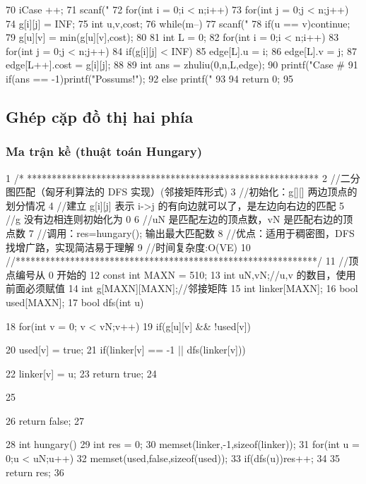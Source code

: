 \documentclass[11pt]{article}
\begin{document}
\begin{Code}
{{70              iCase ++;
71              scanf("%
72              for(int i = 0;i < n;i++)
73                  for(int j = 0;j < n;j++)
74                      g[i][j] = INF;
75              int u,v,cost;
76              while(m--){
77                  scanf("%
78                  if(u == v)continue;
79                  g[u][v] = min(g[u][v],cost);
80              }
81              int L = 0;
82              for(int i = 0;i < n;i++)
83                  for(int j = 0;j < n;j++)
84                      if(g[i][j] < INF){
85                          edge[L].u = i;
86                          edge[L].v = j;
87                          edge[L++].cost = g[i][j];
88                      }
89              int ans = zhuliu(0,n,L,edge);
90              printf("Case #%
91              if(ans == -1)printf("Possums!\n");
92              else printf("%
93       }
94       return 0;
95 }
\end{Code}

\subsection{Ghép cặp đồ thị hai phía}

\subsubsection{Ma trận kề (thuật toán Hungary)}

\begin{Code}
 1   /* ***********************************************************
 2   //二分图匹配（匈牙利算法的 DFS 实现）(邻接矩阵形式)
 3   //初始化：g[][] 两边顶点的划分情况
 4   //建立 g[i][j] 表示 i->j 的有向边就可以了，是左边向右边的匹配
 5   //g 没有边相连则初始化为 0
 6   //uN 是匹配左边的顶点数，vN 是匹配右边的顶点数
 7   //调用：res=hungary(); 输出最大匹配数
 8   //优点：适用于稠密图，DFS 找增广路，实现简洁易于理解
 9   //时间复杂度:O(VE)
10   //*************************************************************/
11   //顶点编号从 0 开始的
12   const int MAXN = 510;
13   int uN,vN;//u,v 的数目，使用前面必须赋值
14   int g[MAXN][MAXN];//邻接矩阵
15   int linker[MAXN];
16   bool used[MAXN];
17   bool dfs(int u){
18       for(int v = 0; v < vN;v++)
19           if(g[u][v] && !used[v]){
20               used[v] = true;
21               if(linker[v] == -1 || dfs(linker[v])){


22                  linker[v] = u;
23                  return true;
24             }
25         }
26     return false;
27 }
28 int hungary(){
29     int res = 0;
30     memset(linker,-1,sizeof(linker));
31     for(int u = 0;u < uN;u++){
32         memset(used,false,sizeof(used));
33         if(dfs(u))res++;
34     }
35     return res;
36 }
\end{Code}
\end{document}
